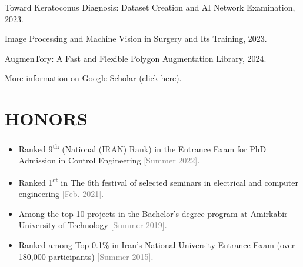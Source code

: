 \documentclass[11pt,a4paper,sans]{moderncv} %
\begin{document}
    \href{https://ieeexplore.ieee.org/abstract/document/10412590/}{\textcolor{gray}{\faCloudDownload} }Toward Keratoconus Diagnosis: Dataset Creation and AI Network Examination, 2023.
 
	\href{https://joc.kntu.ac.ir/article-1-999-en.html}{\textcolor{gray}{\faCloudDownload} }Image Processing and Machine Vision in Surgery and Its Training, 2023.	

	\href{https://arxiv.org/abs/2405.04442}{\textcolor{gray}{\faCloudDownload} }AugmenTory: A Fast and Flexible Polygon Augmentation Library, 2024.	
 
 
 \vspace{1em}
	\centerline{{{	\faGraduationCap  \hspace{0.5 pt} \href{https://scholar.google.com/citations?user=wTnN9IEAAAAJ&hl=en}{More information on Google Scholar (click here).}}}}


	\section{HONORS}
	
	\begin{itemize}
		\item Ranked 9\textsuperscript{th} (National (IRAN) Rank) in the Entrance Exam for PhD Admission in Control Engineering \textcolor{gray}{[Summer 2022]}.
		
		\item Ranked 1\textsuperscript{st} in The 6th festival of selected seminars in electrical and computer engineering \textcolor{gray}{[Feb. 2021]}.

  
	\item 
Among the top 10 projects in the Bachelor's degree program at Amirkabir University of Technology \textcolor{gray}{[Summer 2019]}.

		\item 
Ranked among Top 0.1\% in Iran's National University Entrance Exam (over 180,000 participants) \textcolor{gray}{[Summer 2015]}.

	\end{itemize}
	
\end{document}
